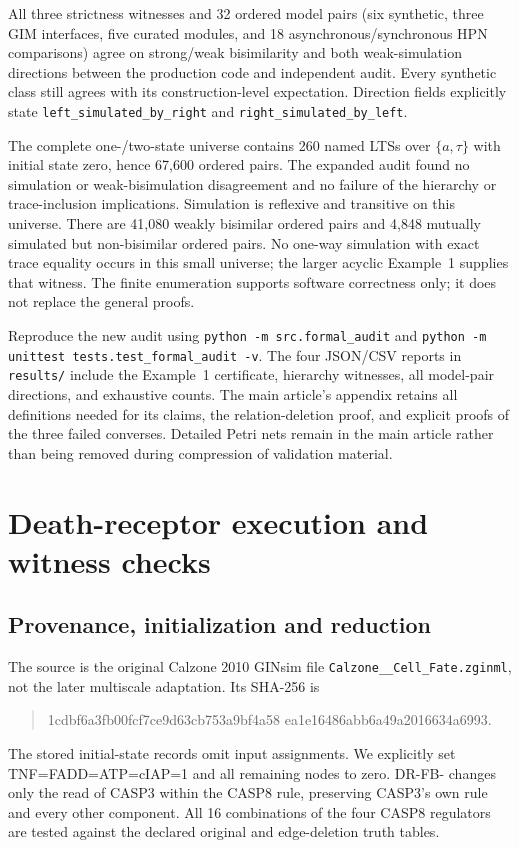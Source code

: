 \documentclass{ws-jbcb}
\numberwithin{equation}{section}
\begin{document}
All three strictness witnesses and 32 ordered model pairs (six synthetic,
three GIM interfaces, five curated modules, and 18 asynchronous/synchronous
HPN comparisons) agree on strong/weak bisimilarity and both weak-simulation
directions between the production code and independent audit. Every synthetic
class still agrees with its construction-level expectation. Direction fields
explicitly state \texttt{left\_simulated\_by\_right} and
\texttt{right\_simulated\_by\_left}.

The complete one-/two-state universe contains 260 named LTSs over
$\{a,\tau\}$ with initial state zero, hence 67,600 ordered pairs. The expanded
audit found no simulation or weak-bisimulation disagreement and no failure of
the hierarchy or trace-inclusion implications. Simulation is reflexive and
transitive on this universe. There are 41,080 weakly bisimilar ordered pairs
and 4,848 mutually simulated but non-bisimilar ordered pairs. No one-way
simulation with exact trace equality occurs in this small universe; the
larger acyclic Example~1 supplies that witness. The finite enumeration
supports software correctness only; it does not replace the general proofs.

Reproduce the new audit using
\texttt{python -m src.formal\_audit} and
\texttt{python -m unittest tests.test\_formal\_audit -v}.
The four JSON/CSV reports in \texttt{results/} include the Example~1
certificate, hierarchy witnesses, all model-pair directions, and exhaustive
counts. The main article's appendix retains all definitions needed for its
claims, the relation-deletion proof, and explicit proofs of the three failed
converses. Detailed Petri nets remain in the main article rather than being
removed during compression of validation material.
\section{Death-receptor execution and witness checks}

\subsection{Provenance, initialization and reduction}
The source is the original Calzone 2010 GINsim file
\texttt{Calzone\_\_Cell\_Fate.zginml}, not the later multiscale adaptation.
Its SHA-256 is
\begin{quote}\small\ttfamily
1cdbf6a3fb00fcf7ce9d63cb753a9bf4a58\allowbreak
ea1e16486abb6a49a2016634a6993.
\end{quote}
The stored initial-state records omit input assignments. We explicitly set
TNF=FADD=ATP=cIAP=1 and all remaining nodes to zero. DR-FB- changes only the
read of CASP3 within the CASP8 rule, preserving CASP3's own rule and every
other component. All 16 combinations of the four CASP8 regulators are tested
against the declared original and edge-deletion truth tables.
\end{document}
